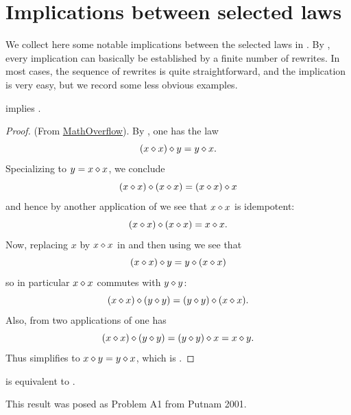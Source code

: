 \chapter{Implications between selected laws}\label{implications-chapter}

We collect here some notable implications between the selected laws in .   By , every implication can basically be established by a finite number of rewrites.  In most cases, the sequence of rewrites is quite straightforward, and the implication is very easy, but we record some less obvious examples.

\begin{theorem}[387 implies 43]\label{387_implies_43}\leanok  {} implies .
\end{theorem}

\begin{proof}\leanok (From \href{https://mathoverflow.net/a/450905/766}{MathOverflow}).
  By , one has the law
\begin{equation}\label{387-again}
  (x \diamond x) \diamond y = y \diamond x.
\end{equation}
Specializing to $y=x \diamond x$, we conclude
$$(x \diamond x) \diamond (x \diamond x) = (x \diamond x) \diamond x$$
and hence by another application of  we see that $x \diamond x$ is idempotent:
\begin{equation}\label{idem}
  (x \diamond x) \diamond (x \diamond x) = x \diamond x.
\end{equation}
Now, replacing $x$ by $x \diamond x$ in  and then using  we see that
$$ (x \diamond x) \diamond y = y \diamond (x \diamond x)$$
so in particular $x \diamond x$ commutes with $y \diamond y$:
\begin{equation}\label{op-idem} (x \diamond x) \diamond (y \diamond y) = (y \diamond y) \diamond (x \diamond x).
\end{equation}
Also, from two applications of  one has
$$(x \diamond x) \diamond (y \diamond y) = (y \diamond y) \diamond x = x \diamond y.$$
Thus  simplifies to $x \diamond y = y \diamond x$, which is .
\end{proof}

\begin{theorem}[29 equivalent to 14]\label{29_equiv_14} \leanok  {} is equivalent to .
\end{theorem}

This result was posed as Problem A1 from Putnam 2001.

